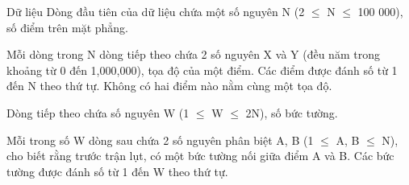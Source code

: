 Dữ liệu  
Dòng đầu tiên của dữ liệu chứa một số nguyên N (2  $\le$  N  $\le$  100 000), số điểm trên mặt phẳng.  

   Mỗi dòng trong N dòng tiếp theo chứa 2 số nguyên X và Y (đều năm trong khoảng từ 0 đến 1,000,000), tọa độ của một điểm. Các điểm được đánh số từ 1 đến N theo thứ tự. Không có hai điểm nào nằm cùng một tọa độ.  

   Dòng tiếp theo chứa số nguyên W (1  $\le$  W  $\le$  2N), số bức tường.  

   Mỗi trong số W dòng sau chứa 2 số nguyên phân biệt A, B (1  $\le$  A, B  $\le$  N), cho biết rằng trước trận lụt, có một bức tường nối giữa điểm A và B. Các bức tường được đánh số từ 1 đến W theo thứ tự.